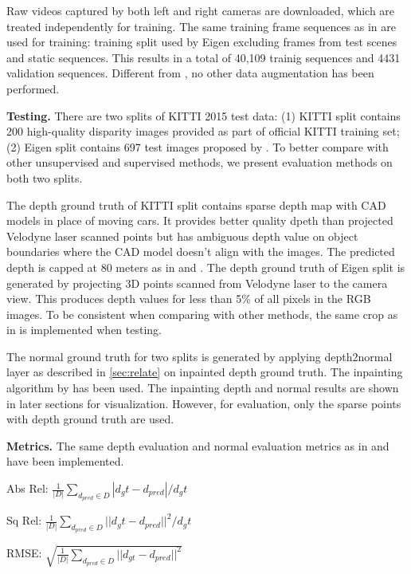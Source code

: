 Raw videos captured by both left and right cameras are downloaded, which are treated independently for training. The same training frame sequences as in \cite{zhou2017unsupervised} are used for training: training split used by Eigen \etal  \cite{eigen2014depth} excluding frames from test scenes and static sequences. This results in a total of 40,109 trainig sequences and 4431 validation sequences. Different from \cite{godard2016unsupervised}, no other data augmentation has been performed.

\textbf{Testing.} 
There are two splits of KITTI 2015 test data: (1) KITTI split contains 200 high-quality disparity images provided as part of official KITTI training set; (2) Eigen split contains 697 test images proposed by \cite{eigen2014depth}. To better compare with other unsupervised and supervised methods, we present evaluation methods on both two splits. 

The depth ground truth of KITTI split contains sparse depth map with CAD models in place of moving cars. It provides better quality dpeth than projected Velodyne laser scanned points but has ambiguous depth value on object boundaries where the CAD model doesn't align with the images. The predicted depth is capped at 80 meters as in \cite{godard2016unsupervised} and \cite{zhou2017unsupervised}. The depth ground truth of Eigen split is generated by projecting 3D points scanned from Velodyne laser to the camera view. This produces depth values for less than 5\% of all pixels in the RGB images. To be consistent when comparing with other methods, the same crop as in \cite{eigen2014depth} is implemented when testing.

The normal ground truth for two splits is generated by applying depth2normal layer as described in \ref{sec:relate} on inpainted depth ground truth. The inpainting algorithm by \cite{silberman2012indoor} has been used. The inpainting depth and normal results are shown in later sections for visualization. However, for evaluation, only the sparse points with depth ground truth are used.

\textbf{Metrics.} The same depth evaluation and normal evaluation metrics as in \cite{eigen2014depth} and \cite{eigen2015predicting} have been implemented.

Abs Rel: $\frac{1}{|D|}\sum_{d_{pred}\in D}|d_gt - d_{pred}|/d_gt$

Sq Rel: $\frac{1}{|D|}\sum_{d_{pred}\in D}||d_gt - d_{pred}||^2/d_gt$

RMSE: $\sqrt{\frac{1}{|D|}\sum_{d_{pred}\in D}||d_{gt} - d_{pred}||^2}$

